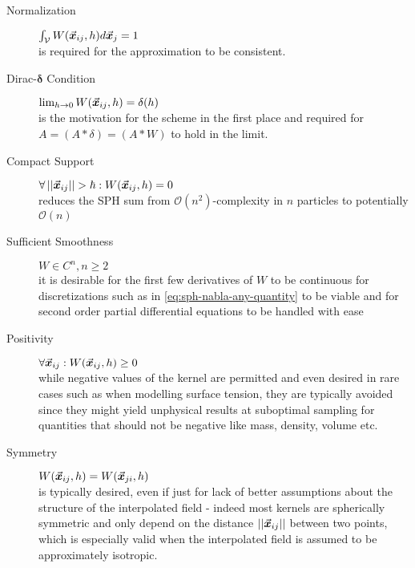 \begin{description}
  \item[Normalization] $\int_\mathcal{V} W(\vec{\bm{x}}_{ij}, h) d\vec{\bm{x}}_j = 1$\\
        is required for the approximation to be consistent.
  \item[Dirac-$\boldsymbol{\delta}$ Condition] $\lim_{h\rightarrow 0} W(\vec{\bm{x}}_{ij}, h) = \delta(h)$ \\
        is the motivation for the scheme in the first place and required for $A=(A * \delta)=(A * W)$ to hold in the limit.
  \item[Compact Support] $\forall \left|\left|\vec{\bm{x}}_{ij}\right|\right| > \hbar: W(\vec{\bm{x}}_{ij}, h) = 0$\\
        reduces the SPH sum from $\mathcal{O}(n^2)$-complexity in $n$ particles to potentially $\mathcal{O}(n)$
  \item[Sufficient Smoothness] $W \in C^n, n\geq 2$\\
        it is desirable for the first few derivatives of $W$ to be continuous for discretizations such as in \autoref{eq:sph-nabla-any-quantity} to be viable and for second order partial differential equations to be handled with ease\autocite*{tutorial}
  \item[Positivity] $\forall \vec{\bm{x}}_{ij}: W(\vec{\bm{x}}_{ij}, h) \geq 0$\\
        while negative values of the kernel are permitted\autocite*{sph-lucy-77} and even desired in rare cases such as when modelling surface tension\autocite*{surface-tension-akinci-2013}, they are typically avoided since they might yield unphysical results at suboptimal sampling for quantities that should not be negative like mass, density, volume etc.
  \item[Symmetry] $W(\vec{\bm{x}}_{ij}, h) = W(\vec{\bm{x}}_{ji}, h)$\\
        is typically desired, even if just for lack of better assumptions about the structure of the interpolated field - indeed most kernels are spherically symmetric and only depend on the distance $\left|\left|\vec{\bm{x}}_{ij}\right|\right|$ between two points, which is especially valid when the interpolated field is assumed to be approximately isotropic.
\end{description}

